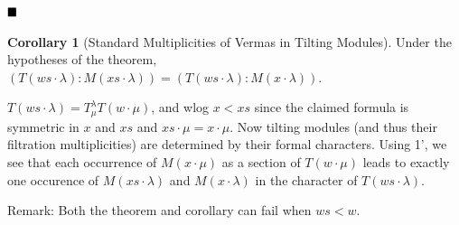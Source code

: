 \documentclass[11pt]{scrartcl}
\theoremstyle{definition}
\theoremstyle{theorem}
\newtheorem{corollary}[theorem]{Corollary}
\theoremstyle{proof}
\newenvironment{proof}
{\pushQED{$\qed$}\pf}
{\par\popQED\endpf}
\theoremstyle{definition}
\theoremstyle{break}
\theoremstyle{problem}
\renewcommand{\qed}[0]{\hfill\blacksquare}
\begin{document}
\(\qed\)

\begin{corollary}[Standard Multiplicities of Vermas in Tilting Modules]

Under the hypotheses of the theorem,
\((T(ws\cdot \lambda): M(xs \cdot \lambda)) = (T(ws\cdot \lambda) : M(x\cdot \lambda))\).\end{corollary}

\begin{proof}

\(T(ws\cdot \lambda) = T_\mu^\lambda T(w\cdot \mu)\), and wlog
\(x < xs\) since the claimed formula is symmetric in \(x\) and \(xs\)
and \(xs\cdot \mu = x\cdot \mu\). Now tilting modules (and thus their
filtration multiplicities) are determined by their formal characters.
Using 1', we see that each occurrence of \(M(x\cdot \mu)\) as a section
of \(T(w\cdot \mu)\) leads to exactly one occurence of
\(M(xs\cdot \lambda)\) and \(M(x\cdot \lambda)\) in the character of
\(T(ws \cdot \lambda)\).\end{proof}

Remark: Both the theorem and corollary can fail when \(ws<w\).




\end{document}
